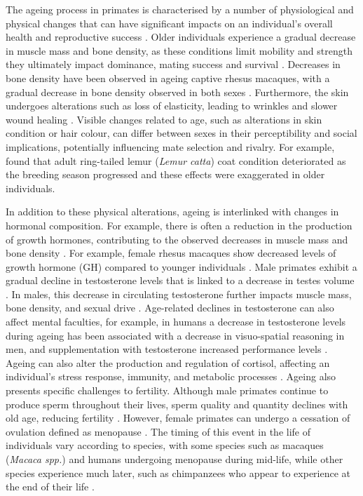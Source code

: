 The ageing process in primates is characterised by a number of physiological and physical changes that can have significant impacts on an individual's overall health and reproductive success \citep{Holloszy.2000}. Older individuals experience a gradual decrease in muscle mass and bone density, as these conditions limit mobility and strength they ultimately impact dominance, mating success and survival \citep{Lowenstine.2016, Almeling.2017}.  Decreases in bone density have been observed in ageing captive rhesus macaques, with a gradual decrease in bone density observed in both sexes \citep{Black.2001}. Furthermore, the skin undergoes alterations such as loss of elasticity, leading to wrinkles and slower wound healing \citep{Montagna.1972, Thomas.2001}. Visible changes related to age, such as alterations in skin condition or hair colour, can differ between sexes in their perceptibility and social implications, potentially influencing mate selection and rivalry. For example, \citet{Jolly.2009} found that adult ring-tailed lemur (\textit{Lemur catta}) coat condition deteriorated as the breeding season progressed and these effects were exaggerated in older individuals. 

In addition to these physical alterations, ageing is interlinked with changes in hormonal composition. For example, there is often a reduction in the production of growth hormones, contributing to the observed decreases in muscle mass and bone density \citep{Fischer.2011}. For example, female rhesus macaques show decreased levels of growth hormone (GH) compared to younger individuals \citep{Woller.2002}. Male primates exhibit a gradual decline in testosterone levels that is linked to a decrease in testes volume \citep{HANDELSMAN.1985, Strum.1991}. In males, this decrease in circulating testosterone further impacts muscle mass, bone density, and sexual drive \citep{Zohdy.2014, Kenny.2000}. Age-related declines in testosterone can also affect mental faculties, for example, in humans a decrease in testosterone levels during ageing has been associated with a decrease in visuo-spatial reasoning in men, and supplementation with testosterone increased performance levels \citep{Martin.2007}. Ageing can also alter the production and regulation of cortisol, affecting an individual's stress response, immunity, and metabolic processes \citep{Goncharova.2002}.  Ageing also presents specific challenges to fertility. Although male primates continue to produce sperm throughout their lives, sperm quality and quantity declines with old age, reducing fertility \citep{Sitzmann.2008}. However, female primates can undergo a cessation of ovulation defined as menopause \citep{Walker.2008}. The timing of this event in the life of individuals vary according to species, with some species such as macaques (\textit{Macaca spp.}) and humans undergoing menopause during mid-life, while other species experience much later, such as chimpanzees who appear to experience at the end of their life \citep{Herndon.2012}.  

